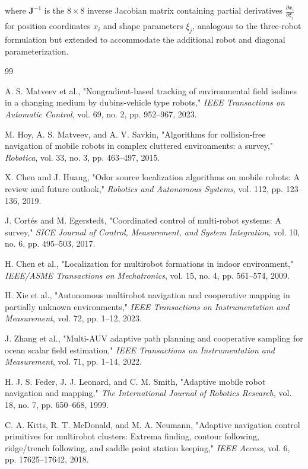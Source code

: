 \documentclass[lettersize,journal]{IEEEtran}
\begin{document}
where $\mathbf{J}^{-1}$ is the $8 \times 8$ inverse Jacobian matrix containing partial derivatives $\frac{\partial x_i}{\partial \xi_j}$ for position coordinates $x_i$ and shape parameters $\xi_j$, analogous to the three-robot formulation but extended to accommodate the additional robot and diagonal parameterization.

\vspace{-2em}

\begin{thebibliography}{99}

 A. S. Matveev et al., "Nongradient-based tracking of environmental field isolines in a changing medium by dubins-vehicle type robots," \textit{IEEE Transactions on Automatic Control}, vol. 69, no. 2, pp. 952--967, 2023.

 M. Hoy, A. S. Matveev, and A. V. Savkin, "Algorithms for collision-free navigation of mobile robots in complex cluttered environments: a survey," \textit{Robotica}, vol. 33, no. 3, pp. 463--497, 2015.

 X. Chen and J. Huang, "Odor source localization algorithms on mobile robots: A review and future outlook," \textit{Robotics and Autonomous Systems}, vol. 112, pp. 123--136, 2019.

 J. Cortés and M. Egerstedt, "Coordinated control of multi-robot systems: A survey," \textit{SICE Journal of Control, Measurement, and System Integration}, vol. 10, no. 6, pp. 495--503, 2017.

 H. Chen et al., "Localization for multirobot formations in indoor environment," \textit{IEEE/ASME Transactions on Mechatronics}, vol. 15, no. 4, pp. 561--574, 2009.

 H. Xie et al., "Autonomous multirobot navigation and cooperative mapping in partially unknown environments," \textit{IEEE Transactions on Instrumentation and Measurement}, vol. 72, pp. 1--12, 2023.

 J. Zhang et al., "Multi-AUV adaptive path planning and cooperative sampling for ocean scalar field estimation," \textit{IEEE Transactions on Instrumentation and Measurement}, vol. 71, pp. 1--14, 2022.

 H. J. S. Feder, J. J. Leonard, and C. M. Smith, "Adaptive mobile robot navigation and mapping," \textit{The International Journal of Robotics Research}, vol. 18, no. 7, pp. 650--668, 1999.

 C. A. Kitts, R. T. McDonald, and M. A. Neumann, "Adaptive navigation control primitives for multirobot clusters: Extrema finding, contour following, ridge/trench following, and saddle point station keeping," \textit{IEEE Access}, vol. 6, pp. 17625--17642, 2018.


\end{thebibliography}
\end{document}
